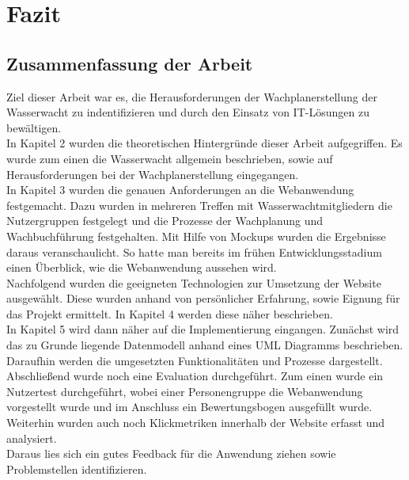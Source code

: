 \documentclass[fontsize=12pt,openright,oneside,paper=a4,BCOR=1cm]{scrbook}
\begin{document}



%
%

\newpage

\renewcommand{\cleardoublepage}{}
\chapter{Fazit}

\section{Zusammenfassung der Arbeit}
Ziel dieser Arbeit war es, die Herausforderungen der Wachplanerstellung der Wasserwacht zu indentifizieren und durch den Einsatz von IT-Lösungen zu bewältigen. \\ 
In Kapitel 2 wurden die theoretischen Hintergründe dieser Arbeit aufgegriffen. Es wurde zum einen die Wasserwacht allgemein beschrieben, sowie auf Herausforderungen bei der Wachplanerstellung eingegangen. \\
In Kapitel 3 wurden die genauen Anforderungen an die Webanwendung festgemacht. Dazu wurden in mehreren Treffen mit Wasserwachtmitgliedern die Nutzergruppen festgelegt und die Prozesse der Wachplanung und Wachbuchführung festgehalten. Mit Hilfe von Mockups wurden die Ergebnisse daraus veranschaulicht. So hatte man bereits im frühen Entwicklungsstadium einen Überblick, wie die Webanwendung aussehen wird. \\
Nachfolgend wurden die geeigneten Technologien zur Umsetzung der Website ausgewählt. Diese wurden anhand von persönlicher Erfahrung, sowie Eignung für das Projekt ermittelt. In Kapitel 4 werden diese näher beschrieben. \\
In Kapitel 5 wird dann näher auf die Implementierung eingangen. Zunächst wird das zu Grunde liegende Datenmodell anhand eines UML Diagramms beschrieben. Daraufhin werden die umgesetzten Funktionalitäten und Prozesse dargestellt. \\
Abschließend wurde noch eine Evaluation durchgeführt. Zum einen wurde ein Nutzertest durchgeführt, wobei einer Personengruppe die Webanwendung vorgestellt wurde und im Anschluss ein Bewertungsbogen ausgefüllt wurde. Weiterhin wurden auch noch Klickmetriken innerhalb der Website erfasst und analysiert. \\ 
Daraus lies sich ein gutes Feedback für die Anwendung ziehen sowie Problemstellen identifizieren.
\end{document}
